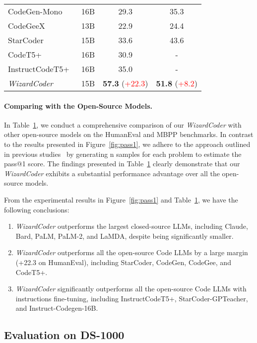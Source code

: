 \documentclass{article}
\newcommand{\modelname}{\emph{WizardCoder}}
\begin{document}
\begin{table}
\begin{tabular}{lccc}
        CodeGen-Mono~\cite{codegen} & 16B & 29.3 & 35.3\\
        CodeGeeX~\cite{CodeGeeX} & 13B & 22.9 & 24.4\\
        StarCoder~\cite{li2023starcoder} & 15B & 33.6 & 43.6\\
        CodeT5+~\cite{CodeT5+} & 16B & 30.9 & -\\
        InstructCodeT5+~\cite{CodeT5+} & 16B & 35.0 & -\\
        \midrule
        \modelname & 15B & \textbf{57.3} (\textcolor{red}{+22.3}) & \textbf{51.8} (\textcolor{red}{+8.2})\\
        \bottomrule
    \end{tabular}
    \label{tab:humaneval_mbpp}
\end{table} 
\paragraph{Comparing with the Open-Source Models.} In Table~\ref{tab:humaneval_mbpp}, we conduct a comprehensive comparison of our \modelname{} with other open-source models on the HumanEval and MBPP benchmarks. In contrast to the results presented in Figure~\ref{fig:pass1}, we adhere to the approach outlined in previous studies~\cite{humeval} by generating n samples for each problem to estimate the pass@1 score. The findings presented in Table~\ref{tab:humaneval_mbpp} clearly demonstrate that our \modelname{} exhibits a substantial performance advantage over all the open-source models.

From the experimental results in Figure~\ref{fig:pass1} and Table~\ref{tab:humaneval_mbpp}, we have the following conclusions:
\begin{enumerate}
    \item \modelname{} outperforms the largest closed-source LLMs, including Claude, Bard, PaLM, PaLM-2, and LaMDA, despite being significantly smaller.
    \item \modelname{} outperforms all the open-source Code LLMs by a large margin (+22.3 on HumanEval), including StarCoder, CodeGen, CodeGee, and CodeT5+.
    \item \modelname{} significantly outperforms all the open-source Code LLMs with instructions fine-tuning, including InstructCodeT5+, StarCoder-GPTeacher, and Instruct-Codegen-16B.
\end{enumerate}

\subsection{Evaluation on DS-1000}
\end{document}
